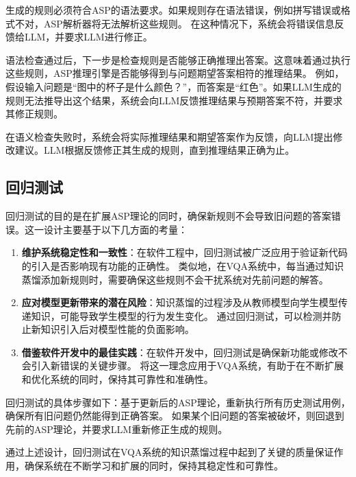 生成的规则必须符合ASP的语法要求。如果规则存在语法错误，例如拼写错误或格式不对，ASP解析器将无法解析这些规则。
在这种情况下，系统会将错误信息反馈给LLM，并要求LLM进行修正。

语法检查通过后，下一步是检查规则是否能够正确推理出答案。这意味着通过执行这些规则，ASP推理引擎是否能够得到与问题期望答案相符的推理结果。
例如，假设输入问题是“图中的杯子是什么颜色？”，而答案是“红色”。如果LLM生成的规则无法推导出这个结果，系统会向LLM反馈推理结果与预期答案不符，并要求其修正规则。

在语义检查失败时，系统会将实际推理结果和期望答案作为反馈，向LLM提出修改建议。LLM根据反馈修正其生成的规则，直到推理结果正确为止。
\subsection{回归测试}
回归测试的目的是在扩展ASP理论的同时，确保新规则不会导致旧问题的答案错误。这一设计主要基于以下几方面的考量：
\begin{enumerate}[itemsep=0pt,parsep=0pt]
\item \textbf{维护系统稳定性和一致性}：​在软件工程中，回归测试被广泛应用于验证新代码的引入是否影响现有功能的正确性。
类似地，在VQA系统中，每当通过知识蒸馏添加新规则时，需要确保这些规则不会干扰系统对先前问题的解答。
\item \textbf{应对模型更新带来的潜在风险}：​知识蒸馏的过程涉及从教师模型向学生模型传递知识，可能导致学生模型的行为发生变化。
通过回归测试，可以检测并防止新知识引入后对模型性能的负面影响。
\item \textbf{借鉴软件开发中的最佳实践}：​在软件开发中，回归测试是确保新功能或修改不会引入新错误的关键步骤。
将这一理念应用于VQA系统，有助于在不断扩展和优化系统的同时，保持其可靠性和准确性。
\end{enumerate}

回归测试的具体步骤如下：基于更新后的ASP理论，重新执行所有历史测试用例，确保所有旧问题仍然能得到正确答案。
如果某个旧问题的答案被破坏，则回退到先前的ASP理论，并要求LLM重新修正生成的规则。

通过上述设计，回归测试在VQA系统的知识蒸馏过程中起到了关键的质量保证作用，确保系统在不断学习和扩展的同时，保持其稳定性和可靠性。
